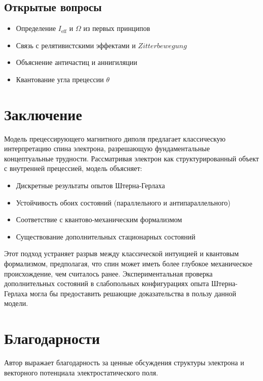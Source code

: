 \documentclass[12pt]{article}
\begin{document}
\subsection{Открытые вопросы}

\begin{itemize}
\item Определение $I_{\text{eff}}$ и $\Omega$ из первых принципов
\item Связь с релятивистскими эффектами и $Zitterbewegung$
\item Объяснение античастиц и аннигиляции
\item Квантование угла прецессии $\theta$
\end{itemize}

\section{Заключение}

Модель прецессирующего магнитного диполя предлагает классическую интерпретацию спина электрона, разрешающую фундаментальные концептуальные трудности. Рассматривая электрон как структурированный объект с внутренней прецессией, модель объясняет:

\begin{itemize}
\item Дискретные результаты опытов Штерна-Герлаха
\item Устойчивость обоих состояний (параллельного и антипараллельного)
\item Соответствие с квантово-механическим формализмом
\item Существование дополнительных стационарных состояний
\end{itemize}

Этот подход устраняет разрыв между классической интуицией и квантовым формализмом, предполагая, что спин может иметь более глубокое механическое происхождение, чем считалось ранее. Экспериментальная проверка дополнительных состояний в слабопольных конфигурациях опыта Штерна-Герлаха могла бы предоставить решающие доказательства в пользу данной модели.

\section*{Благодарности}

Автор выражает благодарность за ценные обсуждения структуры электрона и векторного потенциала электростатического поля.



\end{document}
